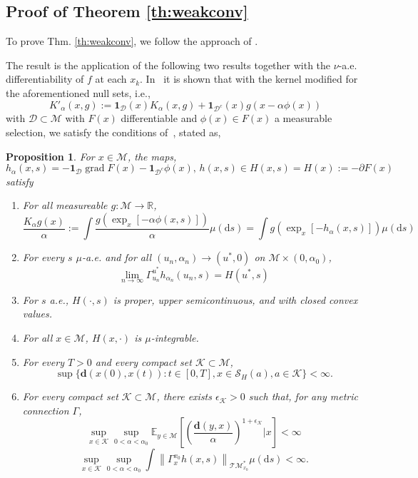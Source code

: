 \documentclass{article}
\newtheorem{proposition}{Proposition}
\newcommand{\CM}{\mathcal{M}}
\newcommand{\CK}{\mathcal{K}}
\newcommand{\rd}{\mathrm{d}}
\newcommand{\bd}{\mathbf{d}}
\DeclareMathOperator{\grad}{grad}
\begin{document}
\subsection{Proof of Theorem \ref{th:weakconv}}

To prove Thm. \ref{th:weakconv}, we follow the approach of \cite{bianchi2022convergence}.


The result is the application of the following two results together with the $\nu$-a.e. differentiability of $f$ at each $x_k$. In~\cite{bianchi2022convergence} it is shown that with the kernel modified for the aforementioned null sets, i.e., 
\[
K'_{\alpha}(x,g) := \mathbf{1}_{\mathcal{D}} (x)K_{\alpha}(x,g)+\mathbf{1}_{\mathcal{D}^c}(x) g(x-\alpha \phi(x))
\]
with $\mathcal{D}\subset \mathcal{M}$ with $F(x)$ differentiable and $\phi(x)\in F(x)$ a measurable selection,
we satisfy the conditions of~\cite[Assumption RM]{bianchi2019constant}, stated as,
\begin{proposition} 
For $x\in\CM$, the maps,
\[
h_{\alpha}(x,s) = -\mathbf{1}_{\mathcal{D}} \grad F(x)-\mathbf{1}_{\mathcal{D}^c} \phi(x),\,h(x,s)\in H(x,s)=H(x):=-\partial F(x)
\]
satisfy 
\begin{enumerate}
    \item For all measureable $g:\mathcal{M}\to \mathbb{R}$,
    \[ 
    \frac{K_{\alpha} g(x)}{\alpha}:=\int \frac{g(\exp_x\left[-\alpha\phi(x,s)\right])}{\alpha}\mu(\rd s) 
    = \int g(\exp_x\left[-h_{\alpha}(x,s)\right])\mu(\rd s)
\]
\item For every $s$ $\mu$-a.e. and for all $(u_n,\alpha_n)\to(u^*,0)$ on $\mathcal{M}\times(0,\alpha_0)$,
\[
\lim\limits_{n\to\infty} \Gamma_{u_n}^{u^*}h_{\alpha_n}(u_n,s) = H(u^*,s)
\]
\item 
For $s$ a.e., $H(\cdot,s)$ is proper, upper semicontinuous, and with closed convex values.
\item For all $x\in\mathcal{M}$, $H(x,\cdot)$ is $\mu$-integrable. 
\item For every $T>0$ and every compact set $\CK\subset \mathcal{M}$,
\[
\sup \{ \bd(x(0),x(t)):t\in [0,T], x\in \mathcal{S}_H(a),a\in \CK\}< \infty.
\]
\item For every compact set $\CK\subset \mathcal{M}$, there exists $\epsilon_\CK>0$ such that, for any metric connection $\Gamma$,
\[
\sup\limits_{x\in \CK} \sup\limits_{0<\alpha<\alpha_0} \mathbb{E}_{y\in\mathcal{M}} \left[ \left(\frac{\bd(y,x)}{\alpha}\right)^{1+\epsilon_\CK} \vert x \right]<\infty
\] 
\[
\sup\limits_{x\in \CK}\sup\limits_{0<\alpha<\alpha_0} \int \left\|\Gamma_x^{x_0} h(x,s)\right\|_{\mathcal{T}\mathcal{M}^*_{x_0}}\mu(\rd s)<\infty.
\]
\end{enumerate}
\end{proposition}
\end{document}

